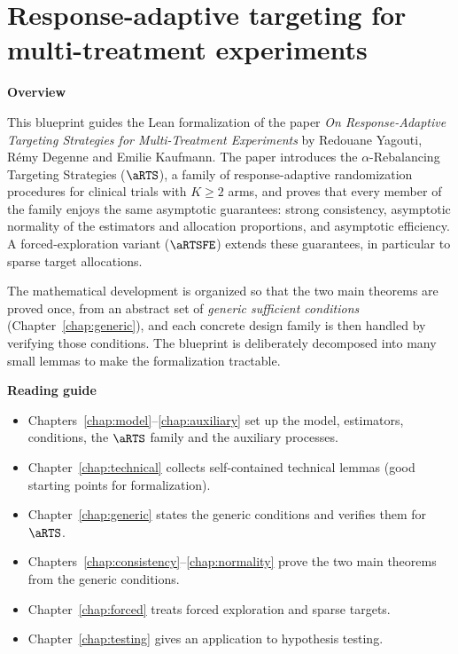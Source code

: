 %

\part{Response-adaptive targeting for multi-treatment experiments}

\textbf{Overview}

This blueprint guides the Lean formalization of the paper
\emph{On Response-Adaptive Targeting Strategies for Multi-Treatment Experiments}
by Redouane Yagouti, Rémy Degenne and Emilie Kaufmann. The paper introduces the
$\alpha$-Rebalancing Targeting Strategies ($\aRTS$), a family of response-adaptive
randomization procedures for clinical trials with $K \geq 2$ arms, and proves
that every member of the family enjoys the same asymptotic guarantees: strong
consistency, asymptotic normality of the estimators and allocation proportions,
and asymptotic efficiency. A forced-exploration variant ($\aRTSFE$) extends these
guarantees, in particular to sparse target allocations.

The mathematical development is organized so that the two main theorems are
proved once, from an abstract set of \emph{generic sufficient conditions}
(Chapter~\ref{chap:generic}), and each concrete design family is then handled by
verifying those conditions. The blueprint is deliberately decomposed into many
small lemmas to make the formalization tractable.

\textbf{Reading guide}
\begin{itemize}
  \item Chapters~\ref{chap:model}--\ref{chap:auxiliary} set up the model,
        estimators, conditions, the $\aRTS$ family and the auxiliary processes.
  \item Chapter~\ref{chap:technical} collects self-contained technical lemmas
        (good starting points for formalization).
  \item Chapter~\ref{chap:generic} states the generic conditions and verifies
        them for $\aRTS$.
  \item Chapters~\ref{chap:consistency}--\ref{chap:normality} prove the two main
        theorems from the generic conditions.
  \item Chapter~\ref{chap:forced} treats forced exploration and sparse targets.
  \item Chapter~\ref{chap:testing} gives an application to hypothesis testing.
\end{itemize}

